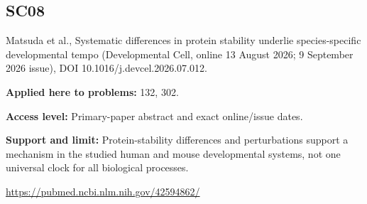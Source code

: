 \documentclass[11pt]{article}
\begin{document}
\subsection*{SC08}\label{check:SC08}

Matsuda et al., Systematic differences in protein stability underlie species-specific developmental tempo (Developmental Cell, online 13 August 2026; 9 September 2026 issue), DOI 10.1016/j.devcel.2026.07.012.

\textbf{Applied here to problems:} 132, 302.

\textbf{Access level:} Primary-paper abstract and exact online/issue dates.

\textbf{Support and limit:} Protein-stability differences and perturbations support a mechanism in the studied human and mouse developmental systems, not one universal clock for all biological processes.

\url{https://pubmed.ncbi.nlm.nih.gov/42594862/}
\end{document}
